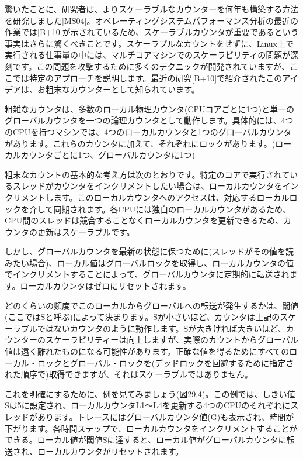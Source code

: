 驚いたことに、研究者は、よりスケーラブルなカウンターを何年も構築する方法を研究しました{[}MS04{]}。オペレーティングシステムパフォーマンス分析の最近の作業では{[}B+10{]}が示されているため、スケーラブルカウンタが重要であるという事実はさらに驚くべきことです。スケーラブルなカウントをせずに、Linux上で実行される仕事量の中には、マルチコアマシンでのスケーラビリティの問題が深刻です。この問題を攻撃するために多くのテクニックが開発されていますが、ここでは特定のアプローチを説明します。最近の研究{[}B+10{]}で紹介されたこのアイデアは、お粗末なカウンターとして知られています。

粗雑なカウンタは、多数のローカル物理カウンタ(CPUコアごとに1つ)と単一のグローバルカウンタを一つの論理カウンタとして動作します。具体的には、4つのCPUを持つマシンでは、4つのローカルカウンタと1つのグローバルカウンタがあります。これらのカウンタに加えて、それぞれにロックがあります。(ローカルカウンタごとに1つ、グローバルカウンタに1つ)

粗末なカウントの基本的な考え方は次のとおりです。特定のコアで実行されているスレッドがカウンタをインクリメントしたい場合は、ローカルカウンタをインクリメントします。このローカルカウンタへのアクセスは、対応するローカルロックを介して同期されます。各CPUには独自のローカルカウンタがあるため、CPU間のスレッドは競合することなくローカルカウンタを更新できるため、カウンタの更新はスケーラブルです。

しかし、グローバルカウンタを最新の状態に保つために(スレッドがその値を読みたい場合)、ローカル値はグローバルロックを取得し、ローカルカウンタの値でインクリメントすることによって、グローバルカウンタに定期的に転送されます。ローカルカウンタはゼロにリセットされます。

どのくらいの頻度でこのローカルからグローバルへの転送が発生するかは、閾値(ここではSと呼ぶ)によって決まります。Sが小さいほど、カウンタは上記のスケーラブルではないカウンタのように動作します。Sが大きければ大きいほど、カウンターのスケーラビリティーは向上しますが、実際のカウントからグローバル値は遠く離れたものになる可能性があります。正確な値を得るためにすべてのローカル・ロックとグローバル・ロックを(デッドロックを回避するために指定された順序で)取得できますが、それはスケーラブルではありません。

これを明確にするために、例を見てみましょう(図29.4)。この例では、しきい値Sは5に設定され、ローカルカウンタL1〜L4を更新する4つのCPUのそれぞれにスレッドがあります。トレースにはグローバルカウンタ値(G)も表示され、時間が下がります。各時間ステップで、ローカルカウンタをインクリメントすることができる。ローカル値が閾値Sに達すると、ローカル値がグローバルカウンタに転送され、ローカルカウンタがリセットされます。

